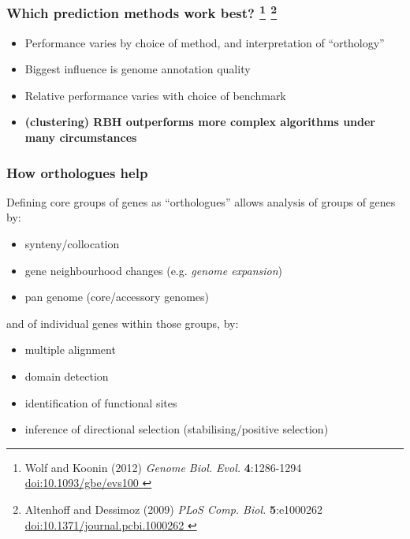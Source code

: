 % 
\begin{frame}
  \frametitle{Which prediction methods work best?
    \footnote{\tiny{Wolf and Koonin (2012) \textit{Genome Biol. Evol.} \textbf{4}:1286-1294 \href{http://dx.doi.org/10.1093/gbe/evs100}{doi:10.1093/gbe/evs100
    }}}
    \footnote{\tiny{Altenhoff and Dessimoz (2009) \textit{PLoS Comp. Biol.} \textbf{5}:e1000262 \href{http://dx.doi.org/10.1371/journal.pcbi.1000262}{doi:10.1371/journal.pcbi.1000262
    }}}
  }
  \begin{itemize}
    \item \textcolor{hutton_green}{Performance varies by choice of method, and interpretation of ``orthology''}
    \item \textcolor{hutton_blue}{Biggest influence is genome annotation quality}
    \item Relative performance varies with choice of benchmark
    \item \textcolor{hutton_purple}{\textbf{(clustering) RBH outperforms more complex algorithms under many circumstances}}
  \end{itemize}
\end{frame}

%
\begin{frame}
  \frametitle{How orthologues help}
  \textcolor{hutton_green}{Defining core groups of genes as ``orthologues'' allows analysis of groups of genes by:}
  \begin{itemize}
    \item \textcolor{hutton_purple}{synteny/collocation}
    \item gene neighbourhood changes (e.g. \textcolor{hutton_purple}{\textit{genome expansion}})
    \item \textcolor{hutton_purple}{pan genome (core/accessory genomes)}
  \end{itemize}
  \textcolor{hutton_blue}{and of individual genes within those groups, by:}
  \begin{itemize}
    \item multiple alignment
    \item domain detection
    \item identification of functional sites
    \item inference of directional selection (stabilising/positive selection)
  \end{itemize}  
\end{frame}


